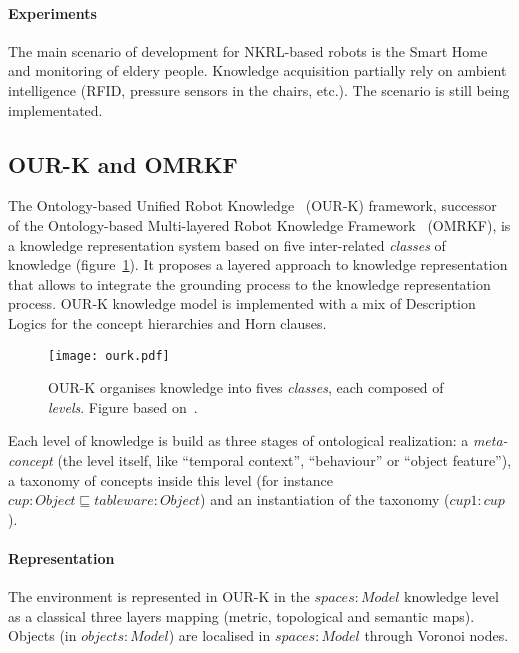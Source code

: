 \documentclass{IEEEtran}
\begin{document}
\paragraph{Experiments} The main scenario of development for NKRL-based robots
is the Smart Home and monitoring of eldery people. Knowledge acquisition
partially rely on ambient intelligence (RFID, pressure sensors in the chairs,
etc.). The scenario is still being implementated.

\subsection{OUR-K and OMRKF}
\label{sect|omrkf}

The Ontology-based Unified Robot Knowledge~\cite{Lim2011} (OUR-K) framework,
successor of the Ontology-based Multi-layered Robot Knowledge
Framework~\cite{Suh2007} (OMRKF), is a knowledge representation system based on
five inter-related \emph{classes} of knowledge (figure~\ref{fig|omrkf}). It
proposes a layered approach to knowledge representation that allows to
integrate the grounding process to the knowledge representation process. OUR-K
knowledge model is implemented with a mix of Description Logics for the concept
hierarchies and Horn clauses.

\begin{figure}
    \centering
    \texttt{[image: ourk.pdf]}

    \caption{OUR-K organises knowledge into fives \emph{classes}, each composed
    of \emph{levels}. Figure based on~\cite{Lim2011}.}

    \label{fig|omrkf}
\end{figure}

Each level of knowledge is build as three stages of ontological realization: a
\emph{meta-concept} (the level itself, like ``temporal context'', ``behaviour''
or ``object feature''), a taxonomy of concepts inside this level (for instance
$cup : Object \sqsubseteq tableware : Object$) and an instantiation of the
taxonomy ($cup1 : cup$).

\paragraph{Representation} The environment is represented in OUR-K in the
$spaces : Model$ knowledge level as a classical three layers mapping (metric,
topological and semantic maps). Objects (in $objects : Model$) are localised in
$spaces : Model$ through Voronoi nodes.
\end{document}
